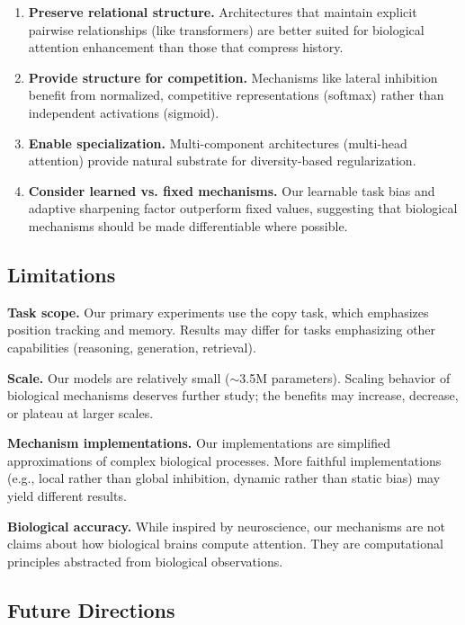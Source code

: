 \begin{enumerate}
\item \textbf{Preserve relational structure.} Architectures that maintain explicit pairwise relationships (like transformers) are better suited for biological attention enhancement than those that compress history.

\item \textbf{Provide structure for competition.} Mechanisms like lateral inhibition benefit from normalized, competitive representations (softmax) rather than independent activations (sigmoid).

\item \textbf{Enable specialization.} Multi-component architectures (multi-head attention) provide natural substrate for diversity-based regularization.

\item \textbf{Consider learned vs. fixed mechanisms.} Our learnable task bias and adaptive sharpening factor outperform fixed values, suggesting that biological mechanisms should be made differentiable where possible.
\end{enumerate}

\subsection{Limitations}

\textbf{Task scope.} Our primary experiments use the copy task, which emphasizes position tracking and memory. Results may differ for tasks emphasizing other capabilities (reasoning, generation, retrieval).

\textbf{Scale.} Our models are relatively small ($\sim$3.5M parameters). Scaling behavior of biological mechanisms deserves further study; the benefits may increase, decrease, or plateau at larger scales.

\textbf{Mechanism implementations.} Our implementations are simplified approximations of complex biological processes. More faithful implementations (e.g., local rather than global inhibition, dynamic rather than static bias) may yield different results.

\textbf{Biological accuracy.} While inspired by neuroscience, our mechanisms are not claims about how biological brains compute attention. They are computational principles abstracted from biological observations.

\subsection{Future Directions}

